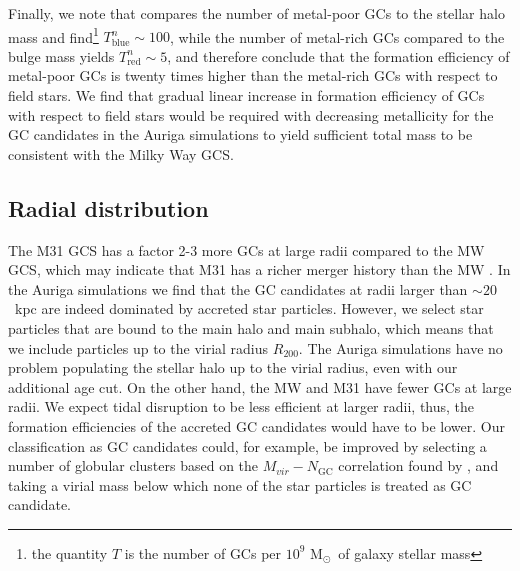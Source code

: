 \documentclass[a4paper,fleqn,usenatbib]{mnras}
\newcommand{\Sun}[0]{\ensuremath{_{\odot}}}
\providecommand{\DIFdelbegin}{} %
\newcommand{\DIFscaledelfig}{0.5}
\newlength{\DIFdelgraphicswidth} %
\newlength{\DIFdelgraphicsheight} %
\newcommand{\DIFdelincludegraphics}[2][]{%
\sbox{\DIFdelgraphicsbox}{\DIFOincludegraphics[#1]{#2}}%
\settoboxwidth{\DIFdelgraphicswidth}{\DIFdelgraphicsbox} %
\settoboxtotalheight{\DIFdelgraphicsheight}{\DIFdelgraphicsbox} %
\scalebox{\DIFscaledelfig}{%
\parbox[b]{\DIFdelgraphicswidth}{\usebox{\DIFdelgraphicsbox}\\[-\baselineskip] \rule{\DIFdelgraphicswidth}{0em}}\llap{\resizebox{\DIFdelgraphicswidth}{\DIFdelgraphicsheight}{%
\setlength{\unitlength}{\DIFdelgraphicswidth}%
\begin{picture}(1,1)%
\thicklines\linethickness{2pt} %
{\color[rgb]{1,0,0}\put(0,0){\framebox(1,1){}}}%
{\color[rgb]{1,0,0}\put(0,0){\line( 1,1){1}}}%
{\color[rgb]{1,0,0}\put(0,1){\line(1,-1){1}}}%
\end{picture}%
}\hspace*{3pt}}} %
} %
\DeclareRobustCommand{\DIFdelbegin}{\DIFOdelbegin \let\includegraphics\DIFdelincludegraphics} %
\begin{document}
Finally, we note that \citet{2006ARA&A..44..193B} compares the number of metal-poor 
GCs to the stellar halo mass and find\footnote{the quantity $T$ is the number of 
GCs per $10^9$ M\Sun \, of galaxy stellar mass} $T^n_{\text{blue}} \sim 100$, 
while the number of metal-rich GCs compared to the bulge mass yields 
$T^n_{\text{red}} \sim 5$, and therefore conclude that the formation efficiency
of metal-poor GCs is twenty times higher than the metal-rich GCs with respect to 
field stars. We find that gradual linear increase in formation efficiency of GCs
with respect to field stars would be required with decreasing metallicity for
the GC candidates in the Auriga simulations to yield sufficient total mass to
be consistent with the Milky Way GCS.

\subsection{Radial distribution}
\label{sec:discussion_Rgc}
The M31 GCS has a factor 2-3 more GCs at large radii compared to the MW GCS,
which may indicate that M31 has a richer merger history than the MW 
\citep{2016ApJ...824...42C}. In the Auriga simulations we find that the GC 
candidates at radii larger than ${\sim}20$~kpc are indeed dominated by accreted
star particles. However, we select star particles that are bound to the main 
halo and main subhalo, which means that we include particles up to the virial 
radius $R_{200}$. The Auriga simulations have no problem populating the stellar 
halo up to the virial radius, even with our additional age cut. On the other hand, 
the MW and M31 have fewer GCs at large radii. We expect tidal disruption to be
less efficient at larger radii, thus, the formation efficiencies of the accreted 
GC candidates would have to be lower. Our classification as GC candidates could, 
for example, be improved by selecting a number of globular clusters based on the 
$M_{vir}-N_{\text{GC}}$ correlation found by \citet{2019arXiv190100900B}, and 
taking a virial mass below which none of the star particles is treated as GC candidate.

\DIFdelbegin %
\end{document}
